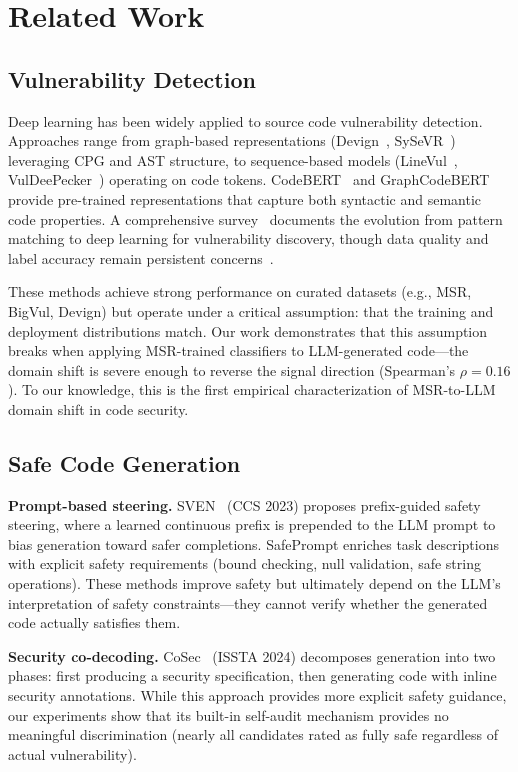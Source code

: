 \documentclass[sigconf,10pt]{acmart}
\begin{document}
\section{Related Work}

\subsection{Vulnerability Detection}

Deep learning has been widely applied to source code vulnerability detection. Approaches range from graph-based representations (Devign~\cite{devign}, SySeVR~\cite{sysevr}) leveraging CPG and AST structure, to sequence-based models (LineVul~\cite{linevul}, VulDeePecker~\cite{vuldeepecker}) operating on code tokens. CodeBERT~\cite{codebert} and GraphCodeBERT~\cite{graphcodebert} provide pre-trained representations that capture both syntactic and semantic code properties. A comprehensive survey~\cite{vuldetectionsurvey,llmsecuritysurvey} documents the evolution from pattern matching to deep learning for vulnerability discovery, though data quality and label accuracy remain persistent concerns~\cite{primevul}.

These methods achieve strong performance on curated datasets (e.g., MSR, BigVul, Devign) but operate under a critical assumption: that the training and deployment distributions match. Our work demonstrates that this assumption breaks when applying MSR-trained classifiers to LLM-generated code---the domain shift is severe enough to reverse the signal direction (Spearman's $\rho=0.16$). To our knowledge, this is the first empirical characterization of MSR-to-LLM domain shift in code security.

\subsection{Safe Code Generation}

\textbf{Prompt-based steering.} SVEN~\cite{sven} (CCS 2023) proposes prefix-guided safety steering, where a learned continuous prefix is prepended to the LLM prompt to bias generation toward safer completions. SafePrompt enriches task descriptions with explicit safety requirements (bound checking, null validation, safe string operations). These methods improve safety but ultimately depend on the LLM's interpretation of safety constraints---they cannot verify whether the generated code actually satisfies them.

\textbf{Security co-decoding.} CoSec~\cite{cosec} (ISSTA 2024) decomposes generation into two phases: first producing a security specification, then generating code with inline security annotations. While this approach provides more explicit safety guidance, our experiments show that its built-in self-audit mechanism provides no meaningful discrimination (nearly all candidates rated as fully safe regardless of actual vulnerability).
\end{document}
